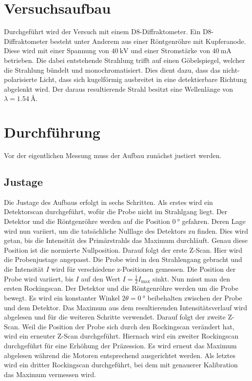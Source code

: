 \documentclass[
  bibliography=totoc,     %
  captions=tableheading,  %
  titlepage=firstiscover, %
]{scrartcl}
\begin{document}
\newpage
\section{Versuchsaufbau}
\label{sec:Aufbau}
Durchgeführt wird der Versuch mit einem D8-Diffraktometer.
Ein D8-Diffraktometer besteht unter Anderem aus einer Röntgenröhre mit Kupferanode. Diese wird mit einer Spannung von $\SI{40}{\kilo\volt}$ und
einer Stromstärke von $\SI{40}{\milli\ampere}$ betrieben. Die dabei entstehende Strahlung trifft auf einen Göbelspiegel, welcher die Strahlung
bündelt und monochromatisiert. Dies dient dazu, dass das nicht-polarisierte Licht, dass sich kugelförmig ausbreitet in eine
detektierbare Richtung abgelenkt wird. Der daraus resultierende Strahl besitzt eine Wellenlänge von $\lambda = \SI{1.54}{\angstrom}$.

\section{Durchführung}
\label{sec:Durchführung}
Vor der eigentlichen Messung muss der Aufbau zunächst justiert werden. 

\subsection{Justage}

Die Justage des Aufbaus erfolgt in sechs Schritten.
Als erstes wird ein Detektorscan durchgeführt, wofür die Probe nicht im Strahlgang liegt. Der Detektor und die Röntgenröhre werden auf die
Position $\SI{0}{\degree}$ gefahren. Deren Lage wird nun variiert, um die tatsächliche Nulllage des Detektors zu finden. Dies wird getan, bis die Intensität des 
Primärstrahls das Maximum durchläuft. Genau diese Position ist die normierte Nullposition. Darauf folgt der erste Z-Scan.
Hier wird die Probenjustage angepasst. Die Probe wird in den Strahlengang gebracht und die Intensität $I$ wird für verschiedene
z-Positionen gemessen. Die Position der Probe wird variiert, bis $I$ auf den Wert $I = \frac{1}{2}I_\text{max}$ sinkt. Nun misst 
man den ersten Rockingscan. Der Detektor und die Röntgenröhre werden um die Probe bewegt. Es wird ein konstanter Winkel $2\theta = \SI{0}{\degree}$ beibehalten
zwischen der Probe und dem Detektor. Das Maximum aus dem resultierenden Intensitätsverlauf wird abgelesen und für die weiteren Schritte verwendet. 
Darauf folgt der zweite Z-Scan. Weil die Position der Probe sich durch den Rockingscan verändert hat, wird ein erneuter Z-Scan durchgeführt.
Hiernach wird ein zweiter Rockingscan durchgeführt für eine Erhöhung der Präzession. Es wird erneut das Maximum abgelesen während die
Motoren entsprechend ausgerichtet werden. Als letztes wird ein dritter Rockingscan durchgeführt, bei dem mit genauerer Kalibration das
Maximum vermessen wird.
\end{document}
